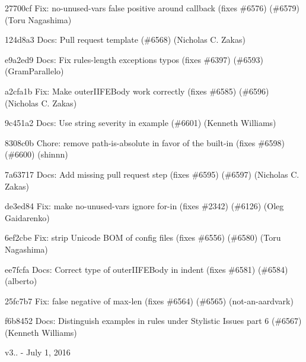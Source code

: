 \begin{DoxyItemize}
\item 27700cf Fix\+: {\ttfamily no-\/unused-\/vars} false positive around callback (fixes \#6576) (\#6579) (Toru Nagashima)
\item 124d8a3 Docs\+: Pull request template (\#6568) (Nicholas C. Zakas)
\item e9a2ed9 Docs\+: Fix rules-\/length exceptions typos (fixes \#6397) (\#6593) (Gram\+Parallelo)
\item a2cfa1b Fix\+: Make outer\+I\+I\+F\+E\+Body work correctly (fixes \#6585) (\#6596) (Nicholas C. Zakas)
\item 9c451a2 Docs\+: Use string severity in example (\#6601) (Kenneth Williams)
\item 8308c0b Chore\+: remove path-\/is-\/absolute in favor of the built-\/in (fixes \#6598) (\#6600) (shinnn)
\item 7a63717 Docs\+: Add missing pull request step (fixes \#6595) (\#6597) (Nicholas C. Zakas)
\item de3ed84 Fix\+: make {\ttfamily no-\/unused-\/vars} ignore for-\/in (fixes \#2342) (\#6126) (Oleg Gaidarenko)
\item 6ef2cbe Fix\+: strip Unicode B\+OM of config files (fixes \#6556) (\#6580) (Toru Nagashima)
\item ee7fcfa Docs\+: Correct type of {\ttfamily outer\+I\+I\+F\+E\+Body} in {\ttfamily indent} (fixes \#6581) (\#6584) (alberto)
\item 25fc7b7 Fix\+: false negative of {\ttfamily max-\/len} (fixes \#6564) (\#6565) (not-\/an-\/aardvark)
\item f6b8452 Docs\+: Distinguish examples in rules under Stylistic Issues part 6 (\#6567) (Kenneth Williams)
\end{DoxyItemize}

v3.. -\/ July 1, 2016


